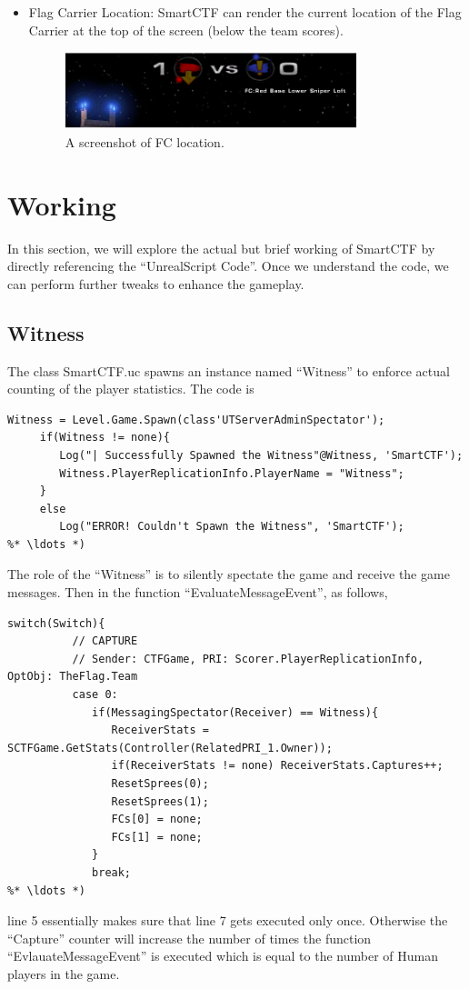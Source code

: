 \documentclass{article}
\begin{document}
\begin{itemize}
\item Flag Carrier Location: SmartCTF can render the current location of the Flag Carrier at the top of the screen (below the team scores).
  \begin{figure}
\centering
\label{fig:fcloc}
\includegraphics[width=0.8\textwidth]{fcloc}
\caption{A screenshot of FC location.}
\end{figure}
  
\end{itemize}

\section{Working}
In this section, we will explore the actual but brief working of SmartCTF by directly referencing the ``UnrealScript Code''.  Once we understand the code, we can perform further tweaks to enhance the gameplay.

\subsection{Witness}
\label{Sec:witness}
The class {\color{Orange}SmartCTF.uc} spawns an instance named ``Witness'' to enforce actual counting of the player statistics.  The code is 
\begin{lstlisting}[frame=single]
     Witness = Level.Game.Spawn(class'UTServerAdminSpectator');
     if(Witness != none){
        Log("| Successfully Spawned the Witness"@Witness, 'SmartCTF');
        Witness.PlayerReplicationInfo.PlayerName = "Witness";
     }
     else
        Log("ERROR! Couldn't Spawn the Witness", 'SmartCTF');
%* \ldots *)
\end{lstlisting}

The role of the ``Witness'' is to silently spectate the game and receive the game messages.  Then in the function ``EvaluateMessageEvent'', as follows,

\begin{lstlisting}[frame=single]
  switch(Switch){
          // CAPTURE
          // Sender: CTFGame, PRI: Scorer.PlayerReplicationInfo, OptObj: TheFlag.Team
          case 0:
             if(MessagingSpectator(Receiver) == Witness){
                ReceiverStats = SCTFGame.GetStats(Controller(RelatedPRI_1.Owner));
                if(ReceiverStats != none) ReceiverStats.Captures++;
                ResetSprees(0);
                ResetSprees(1);
                FCs[0] = none;
                FCs[1] = none;
             }
             break;
%* \ldots *) 
\end{lstlisting}
line 5 essentially makes sure that line 7 gets executed only once.  Otherwise the ``Capture'' counter will increase the number of times the function ``EvlauateMessageEvent'' is executed which is equal to the number of Human players in the game.
\end{document}
